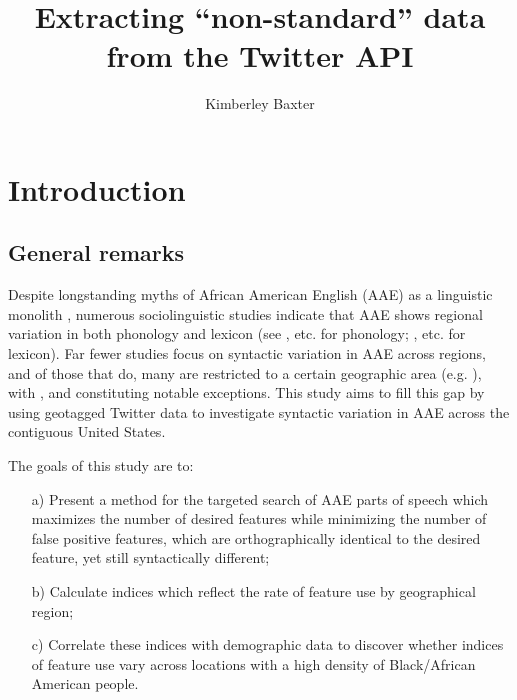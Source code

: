 \documentclass[output=paper,draftmode,colorlinks,citecolor=brown]{langscibook}
\author{Kimberley Baxter\affiliation{New York University}}
\title{Extracting “non-standard” data from the Twitter API}
\begin{document}
\maketitle
\label{chap:baxter}
\graphicspath{{figures/baxter}}



\section{Introduction}
\label{sec:baxter:1}
\subsection{General remarks} %
\label{sec:baxter:1.1}
Despite longstanding myths of African American English (AAE) as a linguistic monolith \citep{Wolfram2007}, numerous sociolinguistic studies indicate that AAE shows regional variation in both phonology and lexicon (see \citealt{Wolfram2007, Lanehart2015}, etc. for phonology; \citealt{Jones2015, Grieve2016}, etc. for lexicon). Far fewer studies focus on syntactic variation in AAE across regions, and of those that do, many are restricted to a certain geographic area (e.g. \citealt{Terry2010, Moody2011}), with \citet{chapters/01-baxter, chapters/02-baxterEtAl}, and \citet{MasisEtAl2022} constituting notable exceptions. This study aims to fill this gap by using geotagged Twitter data to investigate syntactic variation in AAE across the contiguous United States.

The goals of this study are to:

\begin{itemize}
\item[a)] Present a method for the targeted search of AAE parts of speech which maximizes the number of desired features while minimizing the number of false positive features, which are orthographically identical to the desired feature, yet still syntactically different;

\item[b)] Calculate indices which reflect the rate of feature use by geographical region;

\item[c)] Correlate these indices with demographic data to discover whether indices of feature use vary across locations with a high density of Black/African American people.
\end{itemize}
\end{document}
